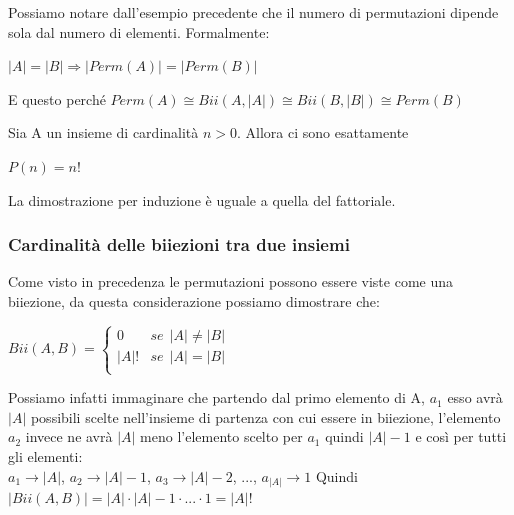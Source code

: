 \begin{note}
Possiamo notare dall'esempio precedente che il numero di permutazioni dipende sola dal numero di elementi. Formalmente:
\begin{center}\vspace{-5pt}
    $|A| = |B| \Longrightarrow |Perm(A)| = |Perm(B)|$
\end{center}
E questo perché $Perm(A) \cong Bii(A,|A|) \cong Bii(B,|B|) \cong Perm(B)$
\end{note}

\begin{proposition}
Sia A un insieme di cardinalità $n > 0$. Allora ci sono esattamente
\begin{center}
    $P(n) = n!$
\end{center}
\end{proposition}
\hspace{-15pt}La dimostrazione per induzione è uguale a quella del fattoriale.

\subsubsection{Cardinalità delle biiezioni tra due insiemi}
Come visto in precedenza le permutazioni possono essere viste come una biiezione, da questa considerazione possiamo dimostrare che:
\begin{center}
    $Bii(A,B) = \begin{cases}
        0 & se \:\: |A| \neq |B|\\
        |A|! & se \:\: |A| = |B|\\
    \end{cases}$
\end{center}
Possiamo infatti immaginare che partendo dal primo elemento di A, $a_1$ esso avrà $|A|$ possibili scelte nell'insieme di partenza con cui essere in biiezione, l'elemento $a_2$ invece ne avrà $|A|$ meno l'elemento scelto per $a_1$ quindi $|A|-1$ e così per tutti gli elementi:\\
$a_1 \to |A|$, $a_2 \to |A| - 1$, $a_3 \to |A| - 2$, ..., $a_{|A|} \to 1$ \hspace{.5cm} Quindi $|Bii(A,B)| = |A| \cdot |A|-1 \cdot ... \cdot 1 = |A|!$

